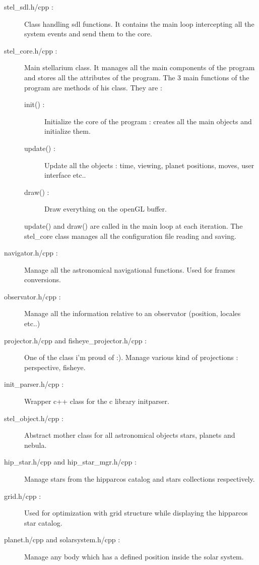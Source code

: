 \documentclass[11pt,oneside] {article}
\begin{document}
\begin{description}
	\item[stel\_sdl.h/cpp :] Class handling sdl functions. It contains the main loop intercepting all the system events and send them to the core.
	\item[stel\_core.h/cpp :] Main stellarium class. It manages all the main components of the program and stores all the attributes of the program.
The 3 main functions of the program are methods of his class. They are :
	\begin{description}
		\item[init() :] Initialize the core of the program : creates all the main objects and initialize them.
		\item[update() :] Update all the objects : time, viewing, planet positions, moves, user interface etc..
		\item[draw() :] Draw everything on the openGL buffer.
	\end{description}
update() and draw() are called in the main loop at each iteration.
The stel\_core class manages all the configuration file reading and saving.

	\item[navigator.h/cpp :]
Manage all the astronomical navigational functions. Used for frames conversions.

	\item[observator.h/cpp :]
Manage all the information relative to an observator (position, locales etc..)

	\item[projector.h/cpp and fisheye\_projector.h/cpp :]
One of the class i'm proud of :). Manage various kind of projections : perspective, fisheye.

	\item[init\_parser.h/cpp :]
Wrapper c++ class for the c library initparser.

	\item[stel\_object.h/cpp :]
Abstract mother class for all astronomical objects stars, planets and nebula.

	\item[hip\_star.h/cpp and hip\_star\_mgr.h/cpp :]
Manage stars from the hipparcos catalog and stars collections respectively.

	\item[grid.h/cpp :]
Used for optimization with grid structure while displaying the hipparcos star catalog.

	\item[planet.h/cpp and solarsystem.h/cpp :]
Manage any body which has a defined position inside the solar system.


\end{description}
\end{document}
